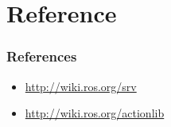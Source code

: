 \documentclass{beamer}
\begin{document}
	\section{Reference}
	\begin{frame}
		\frametitle{References}
		\begin{itemize}
			\item{\url{http://wiki.ros.org/srv}}
			\item{\url{http://wiki.ros.org/actionlib}}
		
		\end{itemize}
	\end{frame}
\end{document}
